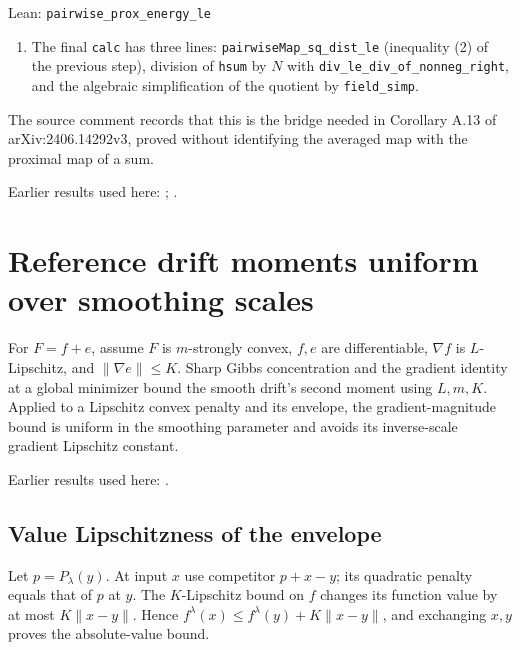 \documentclass[11pt,a4paper]{report}
\begin{document}
\begin{leanbox}{Lean: \texttt{pairwise\_\allowbreak{}prox\_\allowbreak{}energy\_\allowbreak{}le}}
\begin{enumerate}
\item The final \texttt{calc} has three lines: \texttt{pairwise\allowbreak{}Map\_\allowbreak{}sq\_\allowbreak{}dist\_\allowbreak{}le} (inequality (2) of the previous step), division of \texttt{hsum} by \(N\) with \texttt{div\_\allowbreak{}le\_\allowbreak{}div\_\allowbreak{}of\_\allowbreak{}nonneg\_\allowbreak{}right}, and the algebraic simplification of the quotient by \texttt{field\_\allowbreak{}simp}.

\end{enumerate}



The source comment records that this is the bridge needed in Corollary A.13 of arXiv:2406.14292v3, proved without identifying the averaged map with the proximal map of a sum.
\end{leanbox}


Earlier results used here: \cite[Section~3.1.1]{LangevinLean2026IPLA}; \cite[Section~3.1.2]{LangevinLean2026IPLA}.
\section{\texorpdfstring{Reference drift moments uniform over smoothing scales}{Reference drift moments uniform over smoothing scales}}
\label{proof-module-ProximalLangevin-SplittingMoments-lean}


For \(F=f+e\), assume \(F\) is \(m\)-strongly convex, \(f,e\) are differentiable, \(\nabla f\) is \(L\)-Lipschitz, and \(\|\nabla e\|\le K\). Sharp Gibbs concentration and the gradient identity at a global minimizer bound the smooth drift’s second moment using \(L,m,K\). Applied to a Lipschitz convex penalty and its envelope, the gradient-magnitude bound is uniform in the smoothing parameter and avoids its inverse-scale gradient Lipschitz constant.



Earlier results used here: \cite[Section~3.28]{LangevinLean2026ULASC}.
\subsection{\texorpdfstring{Value Lipschitzness of the envelope}{Value Lipschitzness of the envelope}}
\label{report-step-ProximalLangevin-SplittingMoments-lean-1}


Let \(p=P_\lambda(y)\). At input \(x\) use competitor \(p+x-y\); its quadratic penalty equals that of \(p\) at \(y\). The \(K\)-Lipschitz bound on \(f\) changes its function value by at most \(K\|x-y\|\). Hence \(f^\lambda(x)\le f^\lambda(y)+K\|x-y\|\), and exchanging \(x,y\) proves the absolute-value bound.
\end{document}
